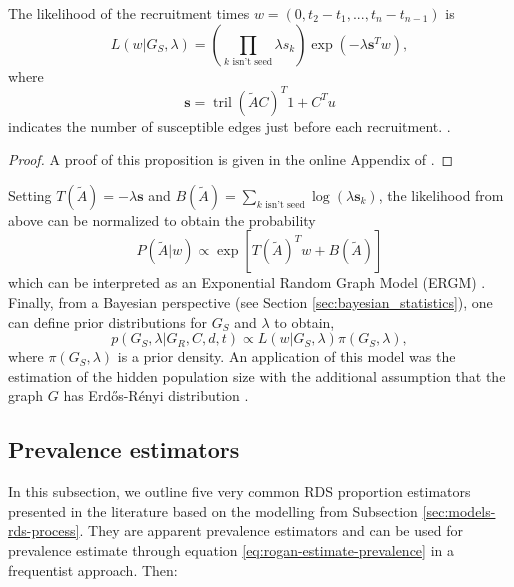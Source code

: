 \begin{proposition}
  The likelihood of the recruitment times $w = (0, t_2 - t_1, ..., t_n -
  t_{n-1})$ is 
  \begin{equation}
    \label{eq:likelihood-wainting-times}
    L(w| G_S, \lambda) = \left(\prod_{k \text{ isn't seed}} \lambda s_k\right) \exp(-\lambda \boldsymbol{s}^Tw), 
  \end{equation}
  where 
  \begin{equation*}
    \boldsymbol{s} = \operatorname{tril}(\tilde{A}C)^T 1 + C^Tu 
  \end{equation*}
  indicates the number of susceptible edges just before each recruitment.
  \cite[p. 197]{crawford2016}.
\end{proposition}

\begin{proof}
  A proof of this proposition is given in the online Appendix of
  \cite{crawford2016}. 
\end{proof}

Setting $T(\tilde{A}) = -\lambda \boldsymbol{s}$ and $B(\tilde{A}) = \sum_{k \text{ isn't seed}}
\log(\lambda \boldsymbol{s}_k)$, the likelihood from above can be normalized to obtain
the probability 
\begin{equation*}
  P(\tilde{A}|w) \propto \exp\left[T(\tilde{A})^Tw + B(\tilde{A})\right]
\end{equation*}
which can be interpreted as an Exponential Random Graph Model (ERGM) \cite[p.
198]{crawford2016}. Finally, from a Bayesian perspective (see Section
\ref{sec:bayesian_statistics}), one can define prior distributions for $G_S$
and $\lambda$ to obtain, 
\begin{equation}
  \label{eq:posterior-distribution-graph}
  p(G_S, \lambda | G_R,C,d,t) \propto L(w|G_S, \lambda) \pi(G_S, \lambda), 
\end{equation}
where $\pi(G_S, \lambda)$ is a prior density. An application of this model was
the estimation of the hidden population size with the additional assumption
that the graph $G$ has Erdős-Rényi distribution 
\cite{crawford2018hidden}. 

\subsection{Prevalence estimators}

In this subsection, we outline five very common RDS proportion estimators presented in the
literature based on the modelling from Subsection
\ref{sec:models-rds-process}. They are apparent prevalence estimators and can
be used for prevalence estimate through equation
\eqref{eq:rogan-estimate-prevalence} in a frequentist approach. Then:

